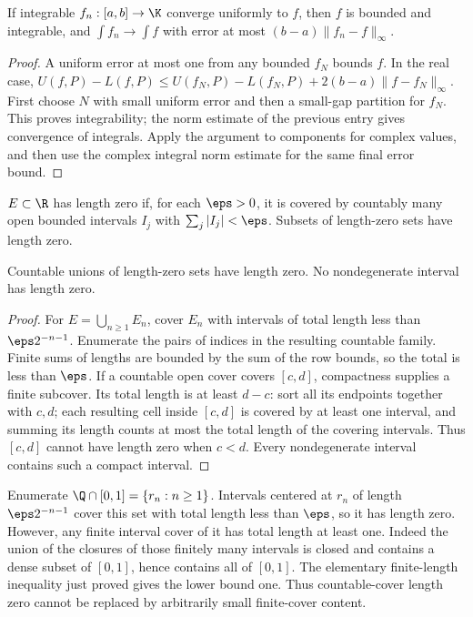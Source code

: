 \begin{theorem}
If integrable $f_n:[a,b]\to\K$ converge uniformly to $f$, then $f$ is
bounded and integrable, and
$\int f_n\to\int f$ with error at most $(b-a)\|f_n-f\|_\infty$.
\end{theorem}
\begin{proof}
A uniform error at most one from any bounded $f_N$ bounds $f$.
In the real case,
$U(f,P)-L(f,P)\le U(f_N,P)-L(f_N,P)+2(b-a)\|f-f_N\|_\infty$.
First choose $N$ with small uniform error and then a small-gap partition
for $f_N$. This proves integrability; the norm estimate of the previous
entry gives convergence of integrals. Apply the argument to components
for complex values, and then use the complex integral norm estimate for
the same final error bound.
\end{proof}

\begin{definition}
$E\subset\R$ has length zero if, for each $\eps>0$, it is covered by
countably many open bounded intervals $I_j$ with $\sum_j|I_j|<\eps$.
Subsets of length-zero sets have length zero.
\end{definition}
\begin{theorem}
Countable unions of length-zero sets have length zero. No nondegenerate
interval has length zero.
\end{theorem}
\begin{proof}
For $E=\bigcup_{n\ge1}E_n$, cover $E_n$ with intervals of total length
less than $\eps2^{-n-1}$. Enumerate the pairs of indices in the resulting
countable family. Finite sums of lengths are bounded by the sum of the
row bounds, so the total is less than $\eps$.
If a countable open cover covers $[c,d]$, compactness supplies a finite
subcover. Its total length is at least $d-c$: sort all its endpoints
together with $c,d$; each resulting cell inside $[c,d]$ is covered by
at least one interval, and summing its length counts at most the total
length of the covering intervals. Thus $[c,d]$ cannot have length zero
when $c<d$. Every nondegenerate interval contains such a compact interval.
\end{proof}

\begin{example}
Enumerate $\Q\cap[0,1]=\{r_n:n\ge1\}$. Intervals centered at $r_n$
of length $\eps2^{-n-1}$ cover this set with total length less than
$\eps$, so it has length zero. However, any finite interval cover of it
has total length at least one. Indeed the union of the closures of those
finitely many intervals is closed and contains a dense subset of $[0,1]$,
hence contains all of $[0,1]$. The elementary finite-length inequality
just proved gives the lower bound one. Thus countable-cover length zero
cannot be replaced by arbitrarily small finite-cover content.
\end{example}

